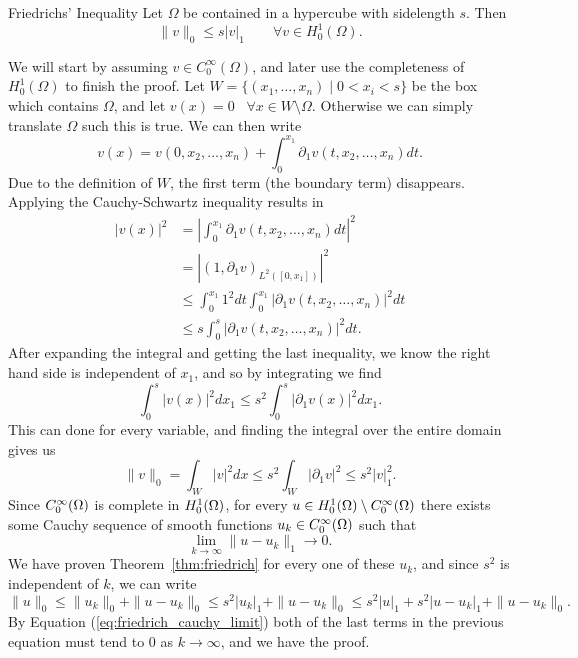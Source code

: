 \begin{thmx}{Friedrichs' Inequality}
Let $\Omega$ be contained in a hypercube with sidelength $s$. Then 
\begin{equation*}
    \| v \|_0 \leq s |v|_1 \quad \quad \forall v \in H_0^1(\Omega).
\end{equation*}\label{thm:friedrich}
\vspace{-8mm}
\end{thmx}
\begin{bev}
We will start by assuming $v \in C_0^{\infty}(\Omega)$, and later use the 
completeness of $H_0^1(\Omega)$ to finish the proof.
Let $W = \{ (x_1, \ldots, x_n) \mid 0 < x_i < s \}$ be the box 
which contains $\Omega$, and let $v(x)=0$ \, $\forall x
\in W\setminus \Omega$. Otherwise we can simply translate $\Omega$ such 
this is true.
 We can then write 
\begin{equation*}
v(x)=v(0, x_2, \ldots, x_n) + \int_{0}^{x_1} \partial _1 v(t,x_2, \ldots, x_n) dt.
\end{equation*}
Due to the definition of $W$, the first term (the boundary term) 
disappears. Applying the Cauchy-Schwartz inequality results in 
\begin{align*}
    |v(x)|^2 &= \left|\int_{0}^{x_1} \partial _1 v(t,x_2, \ldots, x_n) dt \right|^2 \\ 
    &= |{(1, \partial _1 v)}_{L^2([0,x_1])}|^2 \\
    & \leq \int_{0}^{x_1} 1^2 dt \int_{0}^{x_1}|\partial_1 v(t, x_2, \ldots, x_n)|^2 dt \\ 
    &\leq s \int_{0}^{s}|\partial_1 v(t, x_2, \ldots, x_n)|^2 dt. 
\end{align*}
After expanding the integral and getting the last inequality, we know 
the right hand side is independent of $x_1$, and so by integrating we find 
\begin{equation*}
    \int_{0}^{s}|v(x)|^2dx_1 \leq s^2\int_{0}^{s}|\partial _1 v(x)|^2dx_1.
\end{equation*}
This can done for every variable, and finding the integral over the entire 
domain gives us 
\begin{equation*}
    \|v\|_0 = \int_{W}|v|^2 dx \leq s^2 \int_{W} |\partial _1v|^2 \leq s^2 |v|_1^2.
\end{equation*}
Since $C^\infty_0(\Omega)$ is complete in $H_0^1(\Omega)$, for every $u \in H_0^1(\Omega)\setminus C^\infty_0(\Omega)$
there exists some Cauchy sequence of smooth functions $u_k \in C^\infty_0(\Omega)$
 such that 
\begin{equation}
    \lim_{k \to \infty} \| u-u_k\|_1 \to 0.
    \label{eq:friedrich_cauchy_limit}
\end{equation}
We have proven Theorem~\ref*{thm:friedrich} for every one of these $u_k$, and 
since $s^2$ is independent of $k$, we can write 
\begin{equation*}
    \|u\|_0 \leq \|u_k\|_0 + \|u-u_k\|_0 \leq  s^2|u_k|_1 +  \|u-u_k\|_0 \leq s^2|u|_1 + s^2|u-u_k|_1 + \|u-u_k\|_0.
\end{equation*}
By Equation (\ref*{eq:friedrich_cauchy_limit}) both of the last terms in the 
previous equation must tend to $0$ as $k \to \infty$, and we have the proof.
\end{bev}